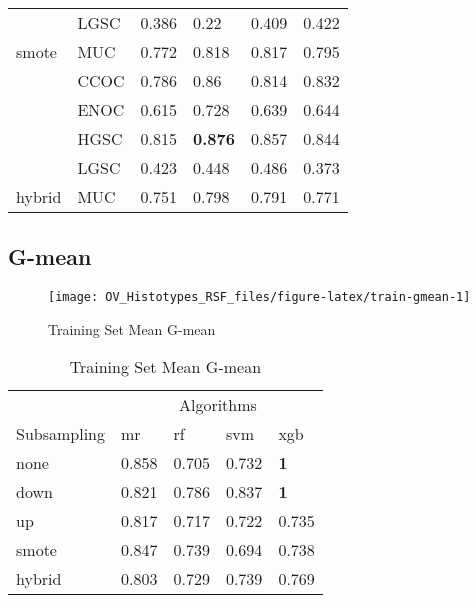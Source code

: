 \documentclass[
]{report}
\begin{document}
\begin{table}
\begin{tabular}[t]{l|l|l|l|l|l}
\cline{2-6}
 & LGSC & 0.386 & 0.22 & 0.409 & 0.422\\
\cline{2-6}
\multirow{-5}{*}{\raggedright\arraybackslash smote} & MUC & 0.772 & 0.818 & 0.817 & 0.795\\
\cline{1-6}
 & CCOC & 0.786 & 0.86 & 0.814 & 0.832\\
\cline{2-6}
 & ENOC & 0.615 & 0.728 & 0.639 & 0.644\\
\cline{2-6}
 & HGSC & 0.815 & \textbf{0.876} & 0.857 & 0.844\\
\cline{2-6}
 & LGSC & 0.423 & 0.448 & 0.486 & 0.373\\
\cline{2-6}
\multirow{-5}{*}{\raggedright\arraybackslash hybrid} & MUC & 0.751 & 0.798 & 0.791 & 0.771\\
\hline
\end{tabular}
\end{table}

\hypertarget{g-mean}{%
\subsection{G-mean}\label{g-mean}}

\begin{figure}[H]

{\centering \texttt{[image: OV\_Histotypes\_RSF\_files/figure-latex/train-gmean-1]} 

}

\caption{Training Set Mean G-mean}\label{fig:train-gmean}
\end{figure}

\begin{table}

\caption{\label{tab:train-gmean-table}Training Set Mean G-mean}
\centering
\begin{tabular}[t]{l|l|l|l|l}
\hline
\multicolumn{1}{c|}{ } & \multicolumn{4}{c}{Algorithms} \\
\cline{2-5}
Subsampling & mr & rf & svm & xgb\\
\hline
none & 0.858 & 0.705 & 0.732 & \textbf{1}\\
\hline
down & 0.821 & 0.786 & 0.837 & \textbf{1}\\
\hline
up & 0.817 & 0.717 & 0.722 & 0.735\\
\hline
smote & 0.847 & 0.739 & 0.694 & 0.738\\
\hline
hybrid & 0.803 & 0.729 & 0.739 & 0.769\\
\hline
\end{tabular}
\end{table}
\end{document}
